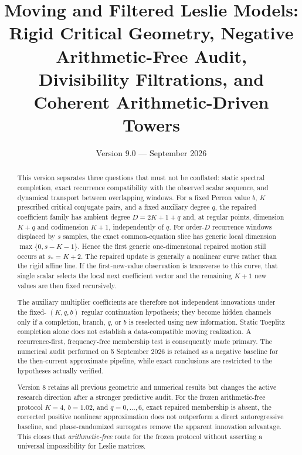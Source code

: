 \documentclass[11pt]{amsart}
\title[Arithmetic-Driven Leslie Towers]{Moving and Filtered Leslie Models:\\Rigid Critical Geometry, Negative Arithmetic-Free Audit,\\Divisibility Filtrations, and Coherent Arithmetic-Driven Towers}
\author{}
\date{Version 9.0 --- September 2026}
\numberwithin{equation}{section}
\theoremstyle{plain}
\theoremstyle{definition}
\theoremstyle{remark}
\begin{document}
\begin{abstract}
This version separates three questions that must not be conflated: static spectral completion,
exact recurrence compatibility with the observed scalar sequence, and dynamical transport between
overlapping windows. For a fixed Perron value $b$, $K$ prescribed critical conjugate pairs, and a
fixed auxiliary degree $q$, the repaired coefficient family has ambient degree $D=2K+1+q$ and,
at regular points, dimension $K+q$ and codimension $K+1$, independently of $q$. For order-$D$
recurrence windows displaced by $s$ samples, the exact common-equation slice has generic local
dimension $\max\{0,s-K-1\}$. Hence the first generic one-dimensional repaired motion still occurs
at $s_*=K+2$. The repaired update is generally a nonlinear curve rather than the rigid affine line.
If the first-new-value observation is transverse to this curve, that single scalar selects the local
next coefficient vector and the remaining $K+1$ new values are then fixed recursively.

The auxiliary multiplier coefficients are therefore not independent innovations under the fixed-
$(K,q,b)$ regular continuation hypothesis; they become hidden channels only if a completion,
branch, $q$, or $b$ is reselected using new information. Static Toeplitz completion alone does not
establish a data-compatible moving realization. A recurrence-first, frequency-free membership test
is consequently made primary. The numerical audit performed on 5 September 2026 is retained as a
negative baseline for the then-current approximate pipeline, while exact conclusions are restricted
to the hypotheses actually verified.

Version 8 retains all previous geometric and numerical results but changes the active research
direction after a stronger predictive audit.  For the frozen arithmetic-free protocol
$K=4$, $b=1.02$, and $q=0,\ldots,6$, exact repaired membership is absent, the corrected
positive nonlinear approximation does not outperform a direct autoregressive baseline, and
phase-randomized surrogates remove the apparent innovation advantage.  This closes that
\emph{arithmetic-free} route for the frozen protocol without asserting a universal impossibility
for Leslie matrices.


\end{abstract}
\end{document}
